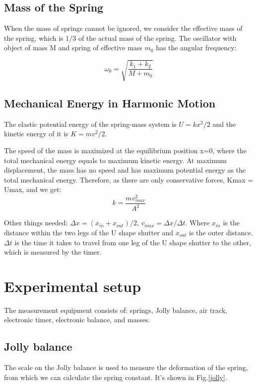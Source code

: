 \documentclass[12pt,a4paper]{article}
\begin{document}
\subsection{Mass of the Spring}
When the mass of springs cannot be ignored, we consider the effective mass of the spring, which is 1/3 of the actual mass of the spring. The oscillator with object of mass M and spring of effective mass $m_0$ has the angular frequency:

\begin{equation}
    \omega_0=\sqrt{\frac{k_1+k_2}{M+m_0}}
\end{equation}

\subsection{Mechanical Energy in Harmonic Motion}
The elastic potential energy of the spring-mass system is $U=kx^2/2$ and the kinetic energy of it is $K=mv^2/2$.\par 
The speed of the mass is maximized at the equilibrium position x=0, where the total mechanical energy equals to maximum kinetic energy. At maximum displacement, the mass has no speed and has maximum potential energy as the total mechanical energy. Therefore, as there are only conservative forces, Kmax = Umax, and we get:
\begin{equation}
    k=\frac{mv^2_{max}}{A^2}
\end{equation}

Other things needed: $\Delta x=(x_{in}+x_{out})/2$, $v_{max}=\Delta x/\Delta t$. Where $x_{in}$ is the distance within the two legs of the U shape shutter and $x_{out}$ is the outer distance. $\Delta t$ is the time it takes to travel from one leg of the U shape shutter to the other, which is measured by the timer.


\section{Experimental setup}
The measurement equipment consists of: springs, Jolly balance, air track, electronic timer, electronic balance, and masses.

\subsection{Jolly balance}
The scale on the Jolly balance is used to measure the deformation of the spring, from which we can calculate the spring constant. It's shown in Fig.\ref{jolly}.
\end{document}
